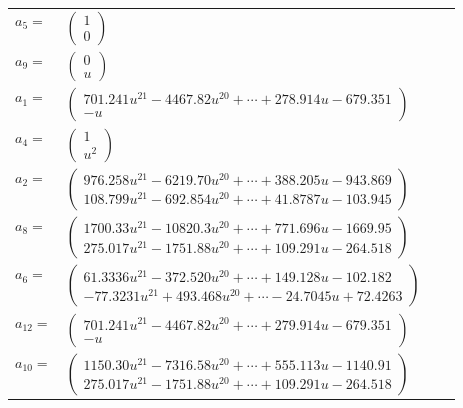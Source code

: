 \documentclass[1p]{elsarticle_modified}
\theoremstyle{definition}
\begin{document}
\begin{tabular}{m{7pt} m{180pt} m{7pt} m{180pt} }
\flushright $a_{5}=$&$\begin{pmatrix}1\\0\end{pmatrix}$ \\
\flushright $a_{9}=$&$\begin{pmatrix}0\\u\end{pmatrix}$ \\
\flushright $a_{1}=$&$\begin{pmatrix}701.241 u^{21}-4467.82 u^{20}+\cdots+278.914 u-679.351\\- u\end{pmatrix}$ \\
\flushright $a_{4}=$&$\begin{pmatrix}1\\u^2\end{pmatrix}$ \\
\flushright $a_{2}=$&$\begin{pmatrix}976.258 u^{21}-6219.70 u^{20}+\cdots+388.205 u-943.869\\108.799 u^{21}-692.854 u^{20}+\cdots+41.8787 u-103.945\end{pmatrix}$ \\
\flushright $a_{8}=$&$\begin{pmatrix}1700.33 u^{21}-10820.3 u^{20}+\cdots+771.696 u-1669.95\\275.017 u^{21}-1751.88 u^{20}+\cdots+109.291 u-264.518\end{pmatrix}$ \\
\flushright $a_{6}=$&$\begin{pmatrix}61.3336 u^{21}-372.520 u^{20}+\cdots+149.128 u-102.182\\-77.3231 u^{21}+493.468 u^{20}+\cdots-24.7045 u+72.4263\end{pmatrix}$ \\
\flushright $a_{12}=$&$\begin{pmatrix}701.241 u^{21}-4467.82 u^{20}+\cdots+279.914 u-679.351\\- u\end{pmatrix}$ \\
\flushright $a_{10}=$&$\begin{pmatrix}1150.30 u^{21}-7316.58 u^{20}+\cdots+555.113 u-1140.91\\275.017 u^{21}-1751.88 u^{20}+\cdots+109.291 u-264.518\end{pmatrix}$ \\

\end{tabular}
\end{document}
